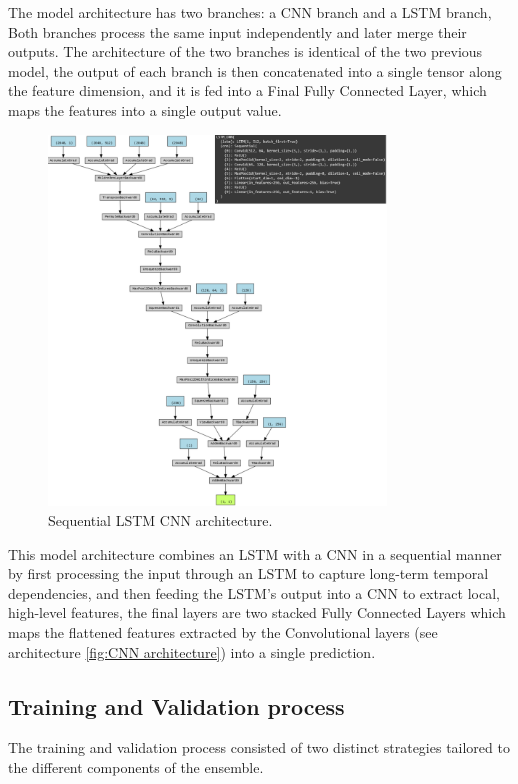 The model architecture has two branches: a CNN branch and a LSTM branch, Both branches process the same input independently and later merge their outputs. The architecture of the two branches is identical of the two previous model, the output of each branch is then concatenated into a single tensor along the feature dimension, and it is fed into a Final Fully Connected Layer, which maps the features into a single output value.
 \begin{figure}[H]
    \centering
    \includegraphics[width=0.8\textwidth]{Machine_learning_thesis/Images/SequentialLSTM_CNN architecture.png}
    \caption{Sequential LSTM CNN architecture.} 
    \label{fig:Sequential LSTM CNN architecture}
\end{figure}
This model architecture combines an LSTM with a CNN in a sequential manner by first processing the input through an LSTM to capture long-term temporal dependencies, and then feeding the LSTM’s output into a CNN to extract local, high-level features, the final layers are two stacked Fully Connected Layers which maps the flattened features extracted by the Convolutional layers (see architecture \ref{fig:CNN architecture}) into a single prediction. 

\subsection{Training and Validation process}
The training and validation process consisted of two distinct strategies tailored to the different components of the ensemble.

